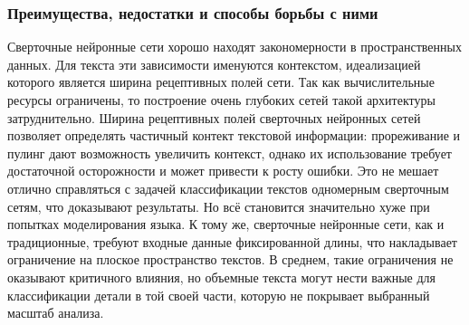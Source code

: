 \subsubsection{Преимущества, недостатки и способы борьбы с ними}
Сверточные нейронные сети хорошо находят закономерности в пространственных данных. Для текста эти зависимости именуются контекстом, идеализацией которого является ширина рецептивных полей сети. 
Так как вычислительные ресурсы ограничены, то построение очень глубоких сетей такой архитектуры затруднительно.
Ширина рецептивных полей сверточных нейронных сетей позволяет определять частичный контект текстовой информации:
прореживание и пулинг дают возможность увеличить контекст, однако их использование требует достаточной осторожности и может привести к росту ошибки. 
Это не мешает отлично справляться с задачей классификации текстов одномерным сверточным сетям, что доказывают результаты. Но всё становится значительно хуже при попытках моделирования языка. К тому же,
сверточные нейронные сети, как и традиционные, требуют входные данные фиксированной длины, что накладывает ограничение на плоское пространство текстов. В среднем, такие ограничения не оказывают критичного влияния, 
но объемные текста могут нести важные для классификации детали в той своей части, которую не покрывает выбранный масштаб анализа. 